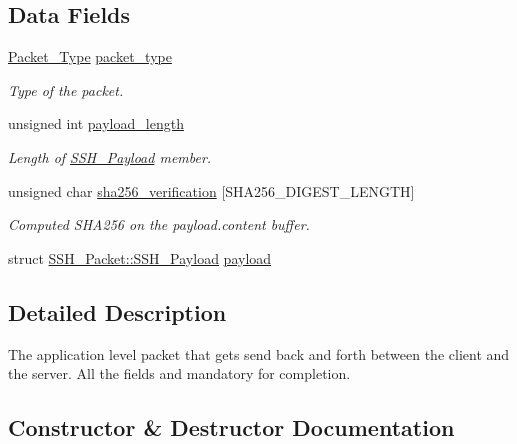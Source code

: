 \subsection*{Data Fields}
\begin{DoxyCompactItemize}
\item 
\hyperlink{Packet_8h_a307e533851c91d484ac30d8471095890}{Packet\+\_\+\+Type} \hyperlink{structSSH__Packet_a96bc51da8a7f7c0ce64e23b3991e335b}{packet\+\_\+type}
\begin{DoxyCompactList}\small\item\em Type of the packet. \end{DoxyCompactList}\item 
unsigned int \hyperlink{structSSH__Packet_a53e4ab1ac5efa60989390c1966a7d3fb}{payload\+\_\+length}
\begin{DoxyCompactList}\small\item\em Length of \hyperlink{structSSH__Packet_1_1SSH__Payload}{S\+S\+H\+\_\+\+Payload} member. \end{DoxyCompactList}\item 
unsigned char \hyperlink{structSSH__Packet_a70c8dd74e6122753c751e92b5b697caf}{sha256\+\_\+verification} \mbox{[}S\+H\+A256\+\_\+\+D\+I\+G\+E\+S\+T\+\_\+\+L\+E\+N\+G\+TH\mbox{]}
\begin{DoxyCompactList}\small\item\em Computed S\+H\+A256 on the payload.\+content buffer. \end{DoxyCompactList}\item 
struct \hyperlink{structSSH__Packet_1_1SSH__Payload}{S\+S\+H\+\_\+\+Packet\+::\+S\+S\+H\+\_\+\+Payload} \hyperlink{structSSH__Packet_a9a14fdf456e41d1e7b8ac7e98e2de83b}{payload}
\end{DoxyCompactItemize}


\subsection{Detailed Description}
The application level packet that gets send back and forth between the client and the server. All the fields and mandatory for completion. 

\subsection{Constructor \& Destructor Documentation}
